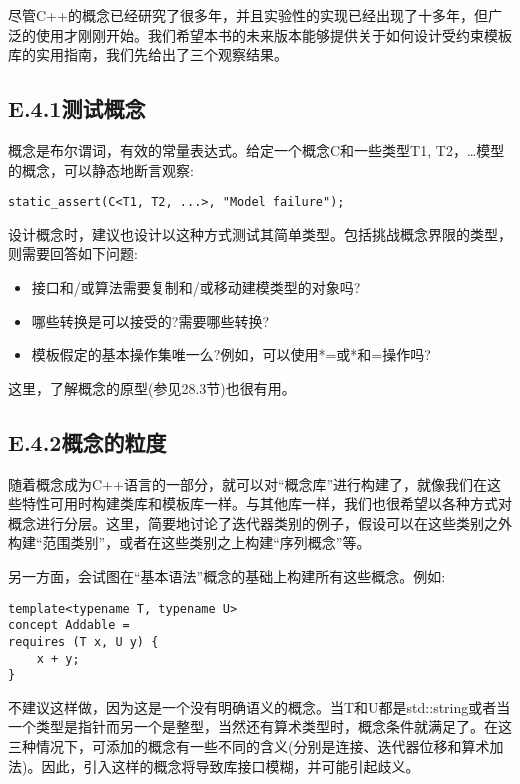 
尽管C++的概念已经研究了很多年，并且实验性的实现已经出现了十多年，但广泛的使用才刚刚开始。我们希望本书的未来版本能够提供关于如何设计受约束模板库的实用指南，我们先给出了三个观察结果。

\subsection{E.4.1\hspace{0.2cm}测试概念}

概念是布尔谓词，有效的常量表达式。给定一个概念C和一些类型T1, T2，…模型的概念，可以静态地断言观察:

\begin{lstlisting}[style=styleCXX]
static_assert(C<T1, T2, ...>, "Model failure");
\end{lstlisting}

设计概念时，建议也设计以这种方式测试其简单类型。包括挑战概念界限的类型，则需要回答如下问题:

\begin{itemize}
\item 
接口和/或算法需要复制和/或移动建模类型的对象吗?

\item 
哪些转换是可以接受的?需要哪些转换?

\item 
模板假定的基本操作集唯一么?例如，可以使用*=或*和=操作吗?
\end{itemize}

这里，了解概念的原型(参见28.3节)也很有用。

\subsection{E.4.2\hspace{0.2cm}概念的粒度}

随着概念成为C++语言的一部分，就可以对“概念库”进行构建了，就像我们在这些特性可用时构建类库和模板库一样。与其他库一样，我们也很希望以各种方式对概念进行分层。这里，简要地讨论了迭代器类别的例子，假设可以在这些类别之外构建“范围类别”，或者在这些类别之上构建“序列概念”等。

另一方面，会试图在“基本语法”概念的基础上构建所有这些概念。例如:

\begin{lstlisting}[style=styleCXX]
template<typename T, typename U>
concept Addable =
requires (T x, U y) {
	x + y;
}
\end{lstlisting}

不建议这样做，因为这是一个没有明确语义的概念。当T和U都是std::string或者当一个类型是指针而另一个是整型，当然还有算术类型时，概念条件就满足了。在这三种情况下，可添加的概念有一些不同的含义(分别是连接、迭代器位移和算术加法)。因此，引入这样的概念将导致库接口模糊，并可能引起歧义。

